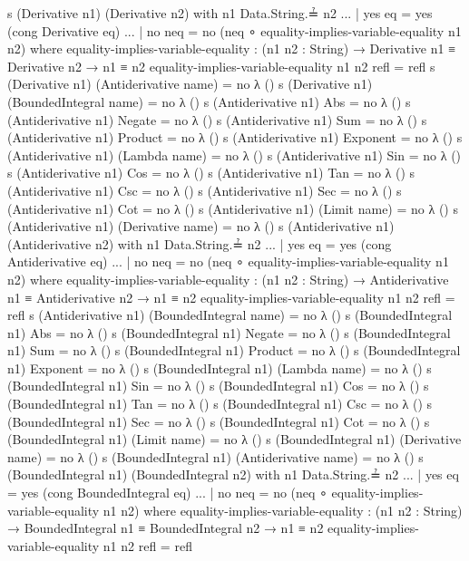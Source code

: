 \documentclass{report}
\begin{document}
\begin{code}
    s (Derivative n1) (Derivative n2) with n1 Data.String.≟ n2
    ... | yes eq = yes (cong Derivative eq)
    ... | no neq = no (neq ∘ equality-implies-variable-equality n1 n2)
      where
      equality-implies-variable-equality : (n1 n2 : String) →
             Derivative n1 ≡ Derivative n2 →
             n1 ≡ n2
      equality-implies-variable-equality n1 n2 refl = refl
    s (Derivative n1) (Antiderivative name) = no λ ()
    s (Derivative n1) (BoundedIntegral name) = no λ ()
    s (Antiderivative n1) Abs = no λ ()
    s (Antiderivative n1) Negate = no λ ()
    s (Antiderivative n1) Sum = no λ ()
    s (Antiderivative n1) Product = no λ ()
    s (Antiderivative n1) Exponent = no λ ()
    s (Antiderivative n1) (Lambda name) = no λ ()
    s (Antiderivative n1) Sin = no λ ()
    s (Antiderivative n1) Cos = no λ ()
    s (Antiderivative n1) Tan = no λ ()
    s (Antiderivative n1) Csc = no λ ()
    s (Antiderivative n1) Sec = no λ ()
    s (Antiderivative n1) Cot = no λ ()
    s (Antiderivative n1) (Limit name) = no λ ()
    s (Antiderivative n1) (Derivative name) = no λ ()
    s (Antiderivative n1) (Antiderivative n2) with n1 Data.String.≟ n2
    ... | yes eq = yes (cong Antiderivative eq)
    ... | no neq = no (neq ∘ equality-implies-variable-equality n1 n2)
      where
      equality-implies-variable-equality : (n1 n2 : String) →
             Antiderivative n1 ≡ Antiderivative n2 →
             n1 ≡ n2
      equality-implies-variable-equality n1 n2 refl = refl
    s (Antiderivative n1) (BoundedIntegral name) = no λ ()
    s (BoundedIntegral n1) Abs = no λ ()
    s (BoundedIntegral n1) Negate = no λ ()
    s (BoundedIntegral n1) Sum = no λ ()
    s (BoundedIntegral n1) Product = no λ ()
    s (BoundedIntegral n1) Exponent = no λ ()
    s (BoundedIntegral n1) (Lambda name) = no λ ()
    s (BoundedIntegral n1) Sin = no λ ()
    s (BoundedIntegral n1) Cos = no λ ()
    s (BoundedIntegral n1) Tan = no λ ()
    s (BoundedIntegral n1) Csc = no λ ()
    s (BoundedIntegral n1) Sec = no λ ()
    s (BoundedIntegral n1) Cot = no λ ()
    s (BoundedIntegral n1) (Limit name) = no λ ()
    s (BoundedIntegral n1) (Derivative name) = no λ ()
    s (BoundedIntegral n1) (Antiderivative name) = no λ ()
    s (BoundedIntegral n1) (BoundedIntegral n2) with n1 Data.String.≟ n2
    ... | yes eq = yes (cong BoundedIntegral eq)
    ... | no neq = no (neq ∘ equality-implies-variable-equality n1 n2)
      where
      equality-implies-variable-equality : (n1 n2 : String) →
             BoundedIntegral n1 ≡ BoundedIntegral n2 →
             n1 ≡ n2
      equality-implies-variable-equality n1 n2 refl = refl
\end{code}
\end{document}
